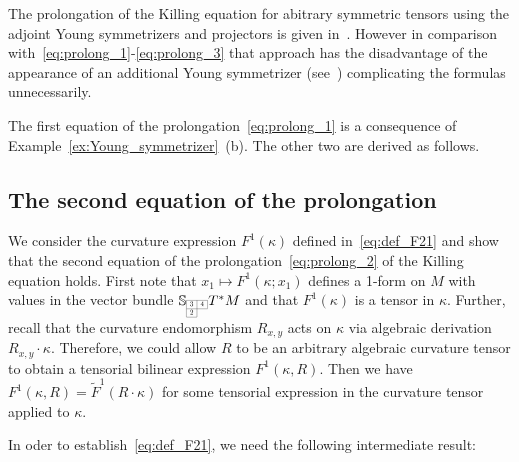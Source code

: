 \documentclass[11pt,a4paper]{article}
\theoremstyle{plain}
\theoremstyle{remark}
\newcommand{\bbS}{\mathbb{S}}
\begin{document}
The prolongation of the Killing equation for abitrary symmetric tensors 
using the adjoint Young symmetrizers and projectors is given
in~\cite{HTY}. However in comparison with~\eqref{eq:prolong_1}-\eqref{eq:prolong_3} that approach has the disadvantage of the appearance of an additional Young
symmetrizer (see~\cite[(7)-(9)]{HTY}) complicating the formulas unnecessarily.


The first equation of the prolongation~\eqref{eq:prolong_1} is a consequence
of Example~\ref{ex:Young_symmetrizer}~(b). The other two are derived as follows.

\subsection{The second equation of the prolongation}
We consider the curvature expression $F^{1}(\kappa)$ defined in~\eqref{eq:def_F21} and show that the second equation of the prolongation~\eqref{eq:prolong_2} of the Killing equation  holds.
First note that $x_1\mapsto F^1(\kappa;x_1)$ defines a 1-form on $M$ with values in the vector bundle $\bbS_{\scaleto{\begin{array}{|c|c|}
\cline{1-2}
3 & 4 \\
\cline{1-2}
2 & \multicolumn{1}{c}{} \\
 \cline{1-1}
\end{array}}{12pt}} T^*M$
and that $F^1(\kappa)$ is a tensor in $\kappa$. Further, recall that the curvature endomorphism $R_{x,y}$ acts on $\kappa$ via algebraic
derivation $R_{x,y}\cdot \kappa$. Therefore, we could allow $R$
to be an arbitrary algebraic curvature tensor to obtain a tensorial bilinear expression $F^1(\kappa,R)$.
Then we have $F^1(\kappa,R) = \tilde F^1(R \cdot \kappa)$ for some tensorial expression in the curvature tensor applied to $\kappa$.


In oder to establish~\eqref{eq:def_F21}, we need the following intermediate result:
\end{document}
